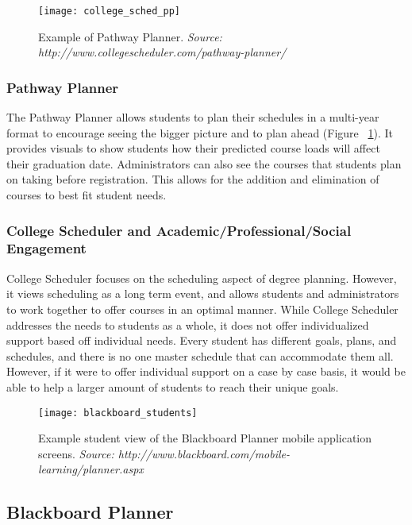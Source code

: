 \begin{figure}[h]
\centering
\texttt{[image: college\_sched\_pp]}
\caption{Example of Pathway Planner. \textit{Source: http://www.collegescheduler.com/pathway-planner/}}
\label{pathway-planner}
\end{figure}

\subsubsection{Pathway Planner}

The Pathway Planner allows students to plan their schedules in a multi-year format to encourage seeing the bigger picture and to plan ahead (Figure ~\ref{pathway-planner}). It provides visuals to show students how their predicted course loads will affect their graduation date. Administrators can also see the courses that students plan on taking before registration. This allows for the addition and elimination of courses to best fit student needs. 

\subsubsection{College Scheduler and Academic/Professional/Social Engagement}

College Scheduler focuses on the scheduling aspect of degree planning. However, it views scheduling as a long term event, and allows students and administrators to work together to offer courses in an optimal manner. While College Scheduler addresses the needs to students as a whole, it does not offer individualized support based off individual needs. Every student has different goals, plans, and schedules, and there is no one master schedule that can accommodate them all. However, if it were to offer individual support on a case by case basis, it would be able to help a larger amount of students to reach their unique goals. 

\begin{figure}[h]
\centering
\texttt{[image: blackboard\_students]}
\caption{Example student view of the Blackboard Planner mobile application screens. \textit{Source: http://www.blackboard.com/mobile-learning/planner.aspx}}
\label{blackboard-students}
\end{figure}

\subsection{Blackboard Planner} 


